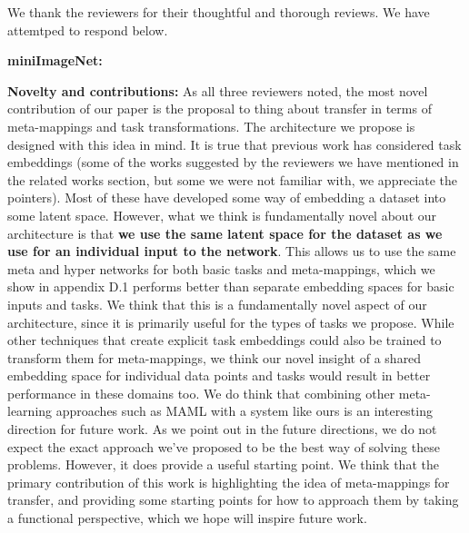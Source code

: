 \documentclass{article}
\begin{document}
We thank the reviewers for their thoughtful and thorough reviews. We have attemtped to respond below. \par
\textbf{miniImageNet:} \par
{}
\textbf{Novelty and contributions:} As all three reviewers noted, the most novel contribution of our paper is the proposal to thing about transfer in terms of meta-mappings and task transformations. The architecture we propose is designed with this idea in mind. It is true that previous work has considered task embeddings (some of the works suggested by the reviewers we have mentioned in the related works section, but some we were not familiar with, we appreciate the pointers). Most of these have developed some way of embedding a dataset into some latent space. However, what we think is fundamentally novel about our architecture is that \textbf{we use the same latent space for the dataset as we use for an individual input to the network}. This allows us to use the same meta and hyper networks for both basic tasks and meta-mappings, which we show in appendix D.1 performs better than separate embedding spaces for basic inputs and tasks. We think that this is a fundamentally novel aspect of our architecture, since it is primarily useful for the types of tasks we propose. While other techniques that create explicit task embeddings could also be trained to transform them for meta-mappings, we think our novel insight of a shared embedding space for individual data points and tasks would result in better performance in these domains too. We do think that combining other meta-learning approaches such as MAML with a system like ours is an interesting direction for future work. As we point out in the future directions, we do not expect the exact approach we've proposed to be the best way of solving these problems. However, it does provide a useful starting point. We think that the primary contribution of this work is highlighting the idea of meta-mappings for transfer, and providing some starting points for how to approach them by taking a functional perspective, which we hope will inspire future work. \par
{}
\end{document}
